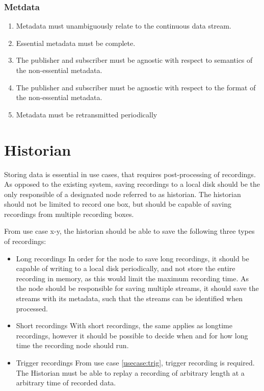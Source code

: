 \subsubsection{Metdata}

\begin{enumerate}
	\item Metadata must unambiguously relate to the continuous data stream.
	\item Essential metadata must be complete.
	\item The publisher and subscriber must be agnostic with respect to semantics of the non-essential metadata.
	\item The publisher and subscriber must be agnostic with respect to the format of the non-essential metadata.
	\item Metadata must be retransmitted periodically
\end{enumerate}


\section{Historian}
Storing data is essential in use cases, that requires post-processing of recordings. As opposed to the existing system, saving recordings to a local disk should be the only responsible of a designated node referred to as historian.
The historian should not be limited to record one box, but should be capable of saving recordings from multiple recording boxes.

From use case x-y, the historian should be able to save the following three types of recordings:
\begin{itemize}
	\item Long recordings
		In order for the node to save long recordings, it should be capable of writing 			to a local disk periodically, and not store the entire recording in memory, 			as this would limit the maximum recording time. As the node should be responsible for 				saving multiple streams, it should save the streams with its metadata, such that the streams can be identified when processed.
	\item Short recordings
		With short recordings, the same applies as longtime recordings, however it 				should be possible to decide when and for how long time the recording node should 			run.
	\item Trigger recordings
		From use case \ref{usecase:trig}, trigger recording is required. The Historian must be able to replay a recording of arbitrary length at a arbitrary time of recorded data.
\end{itemize}


